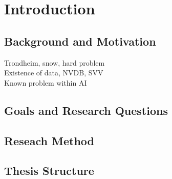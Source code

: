 \chapter{Introduction}

\section{Background and Motivation}
Trondheim, snow, hard problem
\\
Existence of data, NVDB, SVV
\\
Known problem within AI

\section{Goals and Research Questions}

\section{Reseach Method}

\section{Thesis Structure}



\cleardoublepage